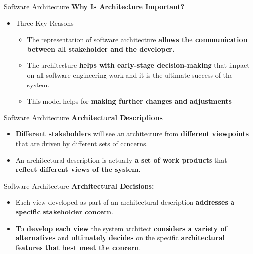 \documentclass{beamer}
\begin{document}
\begin{frame}{Software Architecture}
	\textbf{Why Is  Architecture Important?}
	\begin{itemize}
		\item Three Key Reasons
		\begin{itemize}
			\item  The representation of software architecture \textbf{allows the communication between all stakeholder and the developer.}
			\item The architecture \textbf{helps with early-stage decision-making} that impact on all software engineering work and it is the ultimate success of the system.
			\item  This model helps for \textbf{making further changes and adjustments}
		\end{itemize}
	\end{itemize}
\end{frame}
\begin{frame}{Software Architecture}
	\textbf{Architectural Descriptions}
	\begin{itemize}
		\item \textbf{Different stakeholders} will see an architecture from 
	\textbf{different viewpoints} that are driven by different sets of concerns.
	\item An architectural description is actually\textbf{ a set of work products} that \textbf{reflect different views of the system}.
	\end{itemize}
\end{frame}
\begin{frame}{Software Architecture}
	\textbf{Architectural Decisions:}
	\begin{itemize}
		\item Each view developed as part of an architectural description 
		\textbf{addresses a specific stakeholder concern}. 
		\item \textbf{To develop each view} the system architect \textbf{considers 
			a variety of alternatives} and \textbf{ultimately decides} on the specific \textbf{architectural features that best meet the concern}.
	\end{itemize}
\end{frame}
\end{document}
